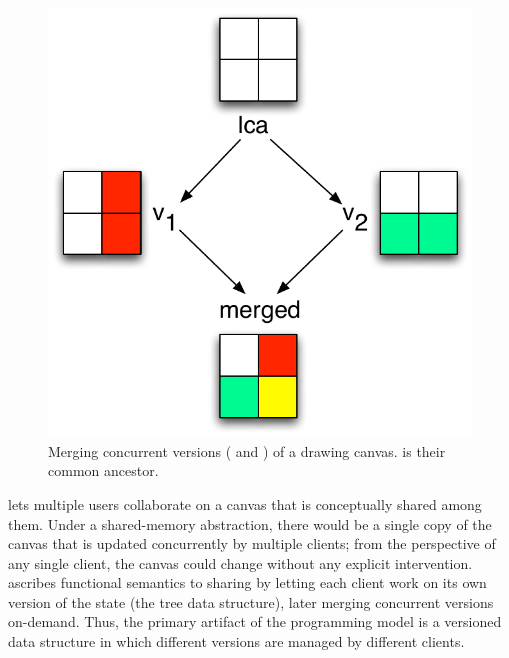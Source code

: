 \begin{figure}
\centering
\includegraphics[scale=0.5]{Figures/canvas-merging}

\caption{Merging concurrent versions ( and  ) of a drawing
canvas.  is their common ancestor.}
\label{fig:canvas-merging}
\end{figure}

\drawsome lets multiple users collaborate on a canvas that is
conceptually shared among them. Under a shared-memory abstraction,
there would be a single copy of the canvas that is updated
concurrently by multiple clients; from the perspective of any single
client, the canvas could change without any explicit
intervention. \name ascribes functional semantics to sharing by
letting each client work on its own version of the state (the tree
data structure), later merging concurrent versions on-demand.  Thus,
the primary artifact of the \name programming model is a versioned
data structure in which different versions are managed by different
clients.


